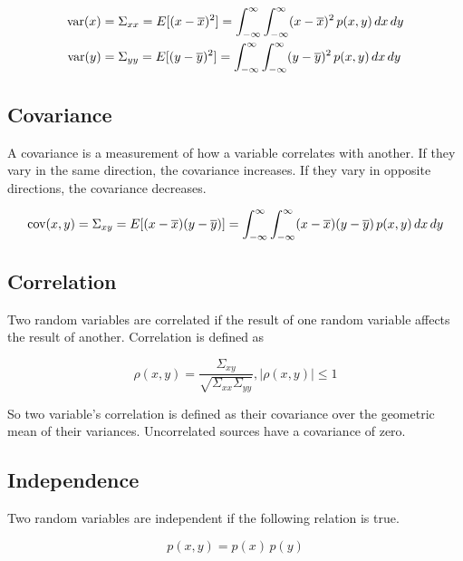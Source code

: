 \begin{align*}
  \operatorname{var}(x) &= \Sigma_{xx} = E[(x - \overline{x})^2] =
    \int_{-\infty}^\infty \int_{-\infty}^\infty (x - \overline{x})^2 \,p(x, y)
    \,dx \,dy \\
  \operatorname{var}(y) &= \Sigma_{yy} = E[(y - \overline{y})^2] =
    \int_{-\infty}^\infty \int_{-\infty}^\infty (y - \overline{y})^2 \,p(x, y)
    \,dx \,dy \\
\end{align*}

\subsection{Covariance}

A covariance is a measurement of how a variable correlates with another. If they
vary in the same direction, the covariance increases. If they vary in opposite
directions, the covariance decreases.

\begin{equation*}
  \operatorname{cov}(x, y) = \Sigma_{xy} = E[(x - \overline{x})(y - \overline{y})] =
    \int_{-\infty}^\infty \int_{-\infty}^\infty (x - \overline{x})
    (y - \overline{y}) \,p(x, y) \,dx \,dy \\
\end{equation*}

\subsection{Correlation}

Two random variables are correlated if the result of one random variable affects
the result of another. Correlation is defined as

\begin{equation*}
  \rho(x, y) = \frac{\Sigma_{xy}}{\sqrt{\Sigma_{xx}\Sigma_{yy}}}, |\rho(x, y)|
    \leq 1
\end{equation*}

So two variable's correlation is defined as their covariance over the geometric
mean of their variances. Uncorrelated sources have a covariance of zero.

\subsection{Independence}

Two random variables are independent if the following relation is true.

\begin{equation*}
  p(x, y) = p(x) \,p(y)
\end{equation*}

